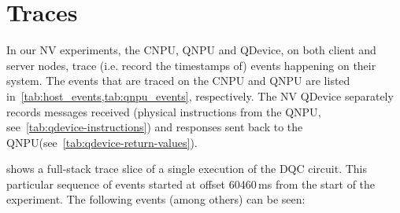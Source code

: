 \section{Traces}
\label{sec:traces}

In our \ac{NV} experiments, the \ac{CNPU}, \ac{QNPU} and \ac{QDevice}, on both client and server nodes, trace (i.e. record the timestamps of) events happening on their system. The events that are traced on the \ac{CNPU} and \ac{QNPU} are listed in~\cref{tab:host_events,tab:qnpu_events}, respectively. The \ac{NV} \ac{QDevice} separately records messages received (physical instructions from the \ac{QNPU}, see~\cref{tab:qdevice-instructions}) and responses sent back to the \ac{QNPU}(see~\cref{tab:qdevice-return-values}).

 shows a full-stack trace slice of a single execution of the \ac{DQC} circuit. This particular sequence of events started at offset 60460\,ms from the start of the experiment. The following events (among others) can be seen:
%
